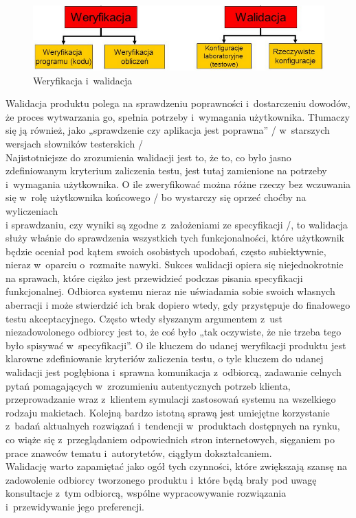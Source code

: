 \documentclass[brudnopis]{xmgr}
\begin{document}
\begin{figure}[th!]
\centering
\includegraphics[width=.7\hsize]{images/weryfikacja_walidacja}
\caption{Weryfikacja i~walidacja\label{RYS.2}}
\end{figure}

\indent \textcolor{sb}{Walidacja produktu polega na} \textcolor{sa}{sprawdzeniu poprawności i~dostarczeniu dowodów,  że proces wytwarzania go, spełnia potrzeby i~wymagania użytkownika. Tłumaczy się ją również, jako „sprawdzenie czy aplikacja jest poprawna” / w~starszych wersjach słowników testerskich /}\cite{ALTKOM}
\\
\indent \textcolor{sb}{Najistotniejsze do zrozumienia walidacji jest to,} \textcolor{sa}{że to, co było jasno zdefiniowanym kryterium zaliczenia testu, jest tutaj zamienione na potrzeby i~wymagania użytkownika.} \textcolor{sb}{O ile zweryfikować można różne rzeczy bez wczuwania się w~rolę użytkownika końcowego / bo wystarczy się oprzeć choćby na wyliczeniach
\\
i sprawdzaniu, czy wyniki są zgodne z~założeniami ze specyfikacji /,} \textcolor{sa}{to walidacja służy właśnie do sprawdzenia wszystkich tych funkcjonalności, które użytkownik będzie oceniał pod kątem swoich osobistych upodobań, często subiektywnie, nieraz w~oparciu o~rozmaite nawyki.}
\textcolor{sb}{Sukces walidacji opiera się niejednokrotnie na sprawach,} \textcolor{sa}{które ciężko jest przewidzieć podczas pisania specyfikacji funkcjonalnej.} \textcolor{sb}{Odbiorca systemu nieraz nie uświadamia sobie swoich własnych aberracji} \textcolor{sa}{i może stwierdzić ich brak dopiero wtedy, gdy przystępuje do finałowego testu akceptacyjnego.} \textcolor{sb}{Często wtedy słyszanym argumentem z~ust niezadowolonego odbiorcy jest to,} \textcolor{sa}{że coś było „tak oczywiste, że nie trzeba tego było spisywać w~specyfikacji”.}
\textcolor{sb}{O ile kluczem do udanej weryfikacji produktu jest klarowne zdefiniowanie kryteriów zaliczenia testu,} \textcolor{sa}{o tyle kluczem do udanej walidacji jest pogłębiona i~sprawna komunikacja z~odbiorcą, zadawanie celnych pytań pomagających w~zrozumieniu autentycznych potrzeb klienta, przeprowadzanie wraz z~klientem symulacji zastosowań systemu na wszelkiego rodzaju makietach.} \textcolor{sb}{Kolejną bardzo istotną sprawą jest umiejętne korzystanie z~badań aktualnych rozwiązań i~tendencji w~produktach dostępnych na rynku,} \textcolor{sa}{co wiąże się z~przeglądaniem odpowiednich stron internetowych, sięganiem po prace znawców tematu i~autorytetów, ciągłym dokształcaniem.}
\\
\indent \textcolor{sb}{Walidację warto zapamiętać jako ogół tych czynności, które zwiększają szansę na zadowolenie odbiorcy tworzonego produktu i~które będą brały pod uwagę konsultacje z~tym odbiorcą,} \textcolor{sa}{wspólne wypracowywanie rozwiązania i~przewidywanie jego preferencji.}\cite{ALTKOM}
\end{document}
